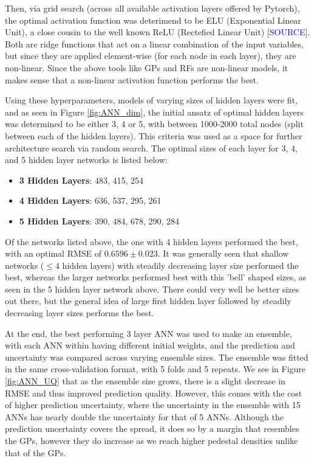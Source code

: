 \documentclass[a4paper, twoside, final, 12pt]{article}
\begin{document}
{Then, via grid search (across all available activation layers offered by Pytorch), the optimal activation function was deterimend to be ELU (Exponential Linear Unit), a close cousin to the well known ReLU (Rectefied Linear Unit) [\textcolor{blue}{SOURCE}]. Both are ridge functions that act on a linear combination of the input variables, but since they are applied element-wise (for each node in each layer), they are non-linear. Since the above tools like GPs and RFs are non-linear models, it makes sense that a non-linear activation function performs the best. 

Using these hyperparameters, models of varying sizes of hidden layers were fit, and as seen in Figure \ref{fig:ANN_dim}, the initial ansatz of optimal hidden layers was determined to be either 3, 4 or 5, with between 1000-2000 total nodes (split between each of the hidden layers). This criteria was used as a space for further architecture search via random search.
The optimal sizes of each layer for 3, 4, and 5 hidden layer networks is listed below: 
\begin{itemize}
	\item \textbf{3 Hidden Layers}: 483, 415, 254
	\item \textbf{4 Hidden Layers}: 636, 537, 295, 261
	\item \textbf{5 Hidden Layers}: 390, 484, 678, 290, 284
\end{itemize} 
Of the networks listed above, the one with 4 hidden layers performed the best, with an optimal RMSE of $0.6596 \pm 0.023$. 
It was generally seen that shallow networks ($\leq 4$ hidden layers) with steadily decreasing layer size performed the best, whereas the larger networks performed best with this 'bell' shaped sizes, as seen in the 5 hidden layer network above. 
There could very well be better sizes out there, but the general idea of large first hidden layer followed by steadily decreasing layer sizes performs the best.

At the end, the best performing 3 layer ANN was used to make an ensemble, with each ANN within having different initial weights, and the prediction and uncertainty was compared across varying ensemble sizes. The ensemble was fitted in the same cross-validation format, with 5 folds and 5 repeats. We see in Figure \ref{fig:ANN_UQ} that as the ensemble size grows, there is a slight decrease in RMSE and thus improved prediction quality. However, this comes with the cost of higher prediction uncertainty, where the uncertainty in the ensemble with 15 ANNs has nearly double the uncertainty for that of 5 ANNs. Although the prediction uncertainty covers the spread, it does so by a margin that resembles the GPs, however they do increase as we reach higher pedestal densities unlike that of the GPs. 

}
\end{document}
